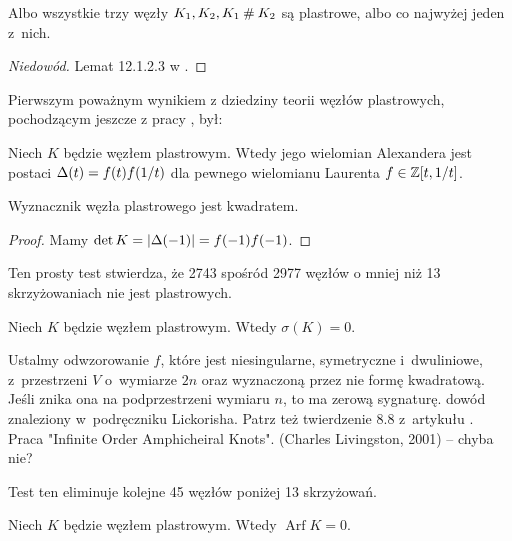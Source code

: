 \begin{proposition}
    Albo wszystkie trzy węzły $K_1, K_2, K_1 \mathbin{\#} K_2$ są plastrowe, albo co najwyżej jeden z~nich.
\end{proposition}

\begin{proof}[Niedowód]
    Lemat 12.1.2.3 w \cite{kawauchi96}.
\end{proof}

Pierwszym poważnym wynikiem z dziedziny teorii węzłów plastrowych, pochodzącym jeszcze z pracy \cite{fox66}, był:

\begin{proposition}
    Niech $K$ będzie węzłem plastrowym.
    Wtedy jego wielomian Alexandera jest postaci $\Delta(t) = f(t) f(1/t)$ dla pewnego wielomianu Laurenta $f \in \mathbb Z[t, 1/t]$.
\end{proposition}

\begin{corollary}
    Wyznacznik węzła plastrowego jest kwadratem.
\end{corollary}

\begin{proof}
    Mamy $\det K = |\Delta(-1)| = f(-1) f(-1)$.
\end{proof}

Ten prosty test stwierdza, że 2743 spośród 2977 węzłów o mniej niż 13 skrzyżowaniach nie jest plastrowych.

\begin{proposition}
    \label{prp:slice_signature}
    Niech $K$ będzie węzłem plastrowym.
    Wtedy $\sigma(K) = 0$.
\end{proposition}

\begin{tobedone}
    Ustalmy odwzorowanie $f$, które jest niesingularne, symetryczne i~dwuliniowe, z~przestrzeni $V$ o~wymiarze $2n$ oraz wyznaczoną przez nie formę kwadratową.
    Jeśli znika ona na podprzestrzeni wymiaru $n$, to ma zerową sygnaturę.
    dowód znaleziony w~podręczniku Lickorisha.
    Patrz też twierdzenie 8.8 z~artykułu \cite{murasugi65}.
    Praca "Infinite Order Amphicheiral Knots". (Charles Livingston, 2001) -- chyba nie?
\end{tobedone}

Test ten eliminuje kolejne 45 węzłów poniżej 13 skrzyżowań.

\begin{proposition}
    Niech $K$ będzie węzłem plastrowym.
    Wtedy $\operatorname{Arf} K = 0$.
\end{proposition}

